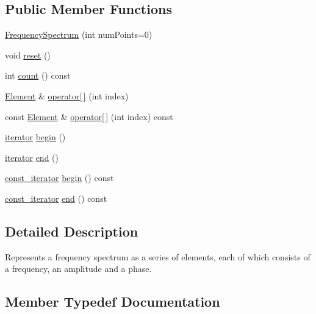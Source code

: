 \subsection*{Public Member Functions}
\begin{DoxyCompactItemize}
\item 
\hyperlink{class_frequency_spectrum_a6270014538a84e1edb5cecf6c3c918ee}{Frequency\+Spectrum} (int num\+Points=0)
\item 
void \hyperlink{class_frequency_spectrum_aa7ea1c62eda905cb7674ea5c9b436aea}{reset} ()
\item 
int \hyperlink{class_frequency_spectrum_a23f805be34e28075fe7e720a71f69b7d}{count} () const
\item 
\hyperlink{struct_frequency_spectrum_1_1_element}{Element} \& \hyperlink{class_frequency_spectrum_afbe235c3468e16f7acceca10cc46537e}{operator\mbox{[}$\,$\mbox{]}} (int index)
\item 
const \hyperlink{struct_frequency_spectrum_1_1_element}{Element} \& \hyperlink{class_frequency_spectrum_a21f7b170c6a74b603acdf1587decbc42}{operator\mbox{[}$\,$\mbox{]}} (int index) const
\item 
\hyperlink{class_frequency_spectrum_a97c7fc372f25a6caef70041f07e4e1f3}{iterator} \hyperlink{class_frequency_spectrum_a92aba05b6376874d54ced70d2e81309e}{begin} ()
\item 
\hyperlink{class_frequency_spectrum_a97c7fc372f25a6caef70041f07e4e1f3}{iterator} \hyperlink{class_frequency_spectrum_aa141310e65ac810ffb006e082658dbbe}{end} ()
\item 
\hyperlink{class_frequency_spectrum_a7dee82b74b040880feb5a0de2d7ab66b}{const\+\_\+iterator} \hyperlink{class_frequency_spectrum_a0c17fa4af644afc2b9555212c80db0f5}{begin} () const
\item 
\hyperlink{class_frequency_spectrum_a7dee82b74b040880feb5a0de2d7ab66b}{const\+\_\+iterator} \hyperlink{class_frequency_spectrum_a68dac125fa1f0bca9c0cc97222db2faa}{end} () const
\end{DoxyCompactItemize}


\subsection{Detailed Description}
Represents a frequency spectrum as a series of elements, each of which consists of a frequency, an amplitude and a phase. 

\subsection{Member Typedef Documentation}
\hypertarget{class_frequency_spectrum_a7dee82b74b040880feb5a0de2d7ab66b}{}\label{class_frequency_spectrum_a7dee82b74b040880feb5a0de2d7ab66b} 
